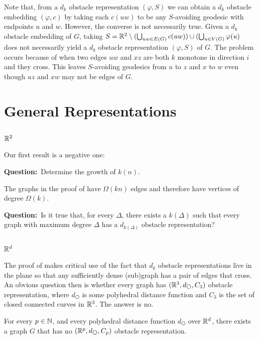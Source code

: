 \documentclass{patmorin}
\newcommand{\question}[1]{\textbf{\color{red}Question:}~#1}
\begin{document}
Note that, from a $d_k$ obstacle representation $(\varphi, S)$ we
can obtain a $d_k$ obstacle embedding $(\varphi, c)$ by taking each
$c(uw)$ to be any $S$-avoiding geodesic with endpoints $u$ and $w$.
However, the converse is not necessarily true.  Given a $d_k$ obstacle
embedding of $G$, taking $S=\mathbb{R}^2\setminus (\bigcup_{uw\in E(G)}c(uw))\cup
(\bigcup_{u\in V(G)} \varphi(u)$ does not necessarily yield a $d_k$ obstacle
representation $(\varphi,S)$ of $G$.  The problem occurs because of
 when two edges $uw$ and $xz$ are both $k$ monotone in
direction $i$ and they cross. This leaves $S$-avoiding geodesics from $u$
to $z$ and $x$ to $w$ even though $uz$ and $xw$ may not be edges of $G$.



\section{General Representations}

\subsection{$\mathbb{R}^2$}

Our first result is a negative one:


\question{Determine the growth of $k(n)$.}

The graphs in the proof of  have $\Omega(kn)$
edges and therefore have vertices of degree $\Omega(k)$.  

\question{Is it true that, for every $\Delta$, there exists a $k(\Delta)$ such that every graph with maximum degree $\Delta$ has a $d_{k(\Delta)}$ obstacle representation?}


\subsection{$\mathbb{R}^d$}

The proof of  makes critical use of the
fact that $d_k$ obstacle representations live in the plane so that
any sufficiently dense (sub)graph has a pair of edges that cross. An
obvious question then is whether every graph has $(\R^3,d_{\hexagon},C_3)$
obstacle representation, where $d_{\hexagon}$ is some polyhedral distance
function and $C_3$ is the set of closed connected curves in $\mathbb{R}^3$.
The answer is no.


\begin{thm}
  For every $p\in\mathbb{N}$, and every polyhedral distance function
  $d_{\hexagon}$ over $\mathbb{R}^d$, there exists a graph $G$ that has no $(\R^p,
  d_{\hexagon}, C_p)$ obstacle representation.
\end{thm}
\end{document}
